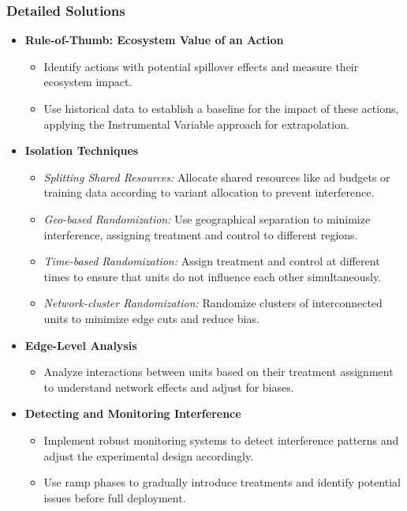 \documentclass{article}
\begin{document}
\subsubsection*{Detailed Solutions}
\begin{itemize}
    \item \textbf{Rule-of-Thumb: Ecosystem Value of an Action}
    \begin{itemize}
        \item Identify actions with potential spillover effects and measure their ecosystem impact.
        \item Use historical data to establish a baseline for the impact of these actions, applying the Instrumental Variable approach for extrapolation.
    \end{itemize}

    \item \textbf{Isolation Techniques}
    \begin{itemize}
        \item \textit{Splitting Shared Resources:} Allocate shared resources like ad budgets or training data according to variant allocation to prevent interference.
        \item \textit{Geo-based Randomization:} Use geographical separation to minimize interference, assigning treatment and control to different regions.
        \item \textit{Time-based Randomization:} Assign treatment and control at different times to ensure that units do not influence each other simultaneously.
        \item \textit{Network-cluster Randomization:} Randomize clusters of interconnected units to minimize edge cuts and reduce bias.
    \end{itemize}

    \item \textbf{Edge-Level Analysis}
    \begin{itemize}
        \item Analyze interactions between units based on their treatment assignment to understand network effects and adjust for biases.
    \end{itemize}

    \item \textbf{Detecting and Monitoring Interference}
    \begin{itemize}
        \item Implement robust monitoring systems to detect interference patterns and adjust the experimental design accordingly.
        \item Use ramp phases to gradually introduce treatments and identify potential issues before full deployment.
    \end{itemize}
\end{itemize}
\end{document}
